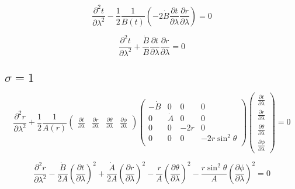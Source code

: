 \begin{equation}
    \frac{\partial^2 t}{\partial \lambda^2} -
    \frac{1}{2} \frac{1}{B(t)}
    \left(-2\dot{B} \frac{\partial t}{\partial \lambda}\frac{\partial r}{\partial \lambda}\right) = 0
\end{equation}

\begin{equation}
    \frac{\partial^2 t}{\partial \lambda^2} +
    \frac{\dot{B}}{B}
    \frac{\partial t}{\partial \lambda}\frac{\partial r}{\partial \lambda} = 0
\end{equation}

\subsection*{$\sigma = 1$}

\begin{equation}
    \frac{\partial^2 r}{\partial \lambda^2} +
    \frac{1}{2} \frac{1}{A(r)}
    \begin{pmatrix}
        \frac{\partial t}{\partial \lambda}      &
        \frac{\partial r}{\partial \lambda}      &
        \frac{\partial \theta}{\partial \lambda} &
        \frac{\partial \phi}{\partial \lambda}
    \end{pmatrix}
    \begin{pmatrix}
        -\dot{B} & 0       & 0   & 0               \\
        0        & \dot{A} & 0   & 0               \\
        0        & 0       & -2r & 0               \\
        0        & 0       & 0   & -2r\sin^2\theta \\
    \end{pmatrix}
    \begin{pmatrix}
        \frac{\partial t}{\partial \lambda}      \\[6pt]
        \frac{\partial r}{\partial \lambda}      \\[6pt]
        \frac{\partial \theta}{\partial \lambda} \\[6pt]
        \frac{\partial \phi}{\partial \lambda}
    \end{pmatrix} = 0
\end{equation}

\begin{equation}
    \frac{\partial^2 r}{\partial \lambda^2} -
    \frac{\dot{B}}{2A}\left(\frac{\partial t}{\partial \lambda}\right)^2 +
    \frac{\dot{A}}{2A}\left(\frac{\partial r}{\partial \lambda}\right)^2 -
    \frac{r}{A}\left(\frac{\partial \theta}{\partial \lambda}\right)^2 -
    \frac{r\sin^2\theta}{A}\left(\frac{\partial \phi}{\partial \lambda}\right)^2 = 0
\end{equation}

